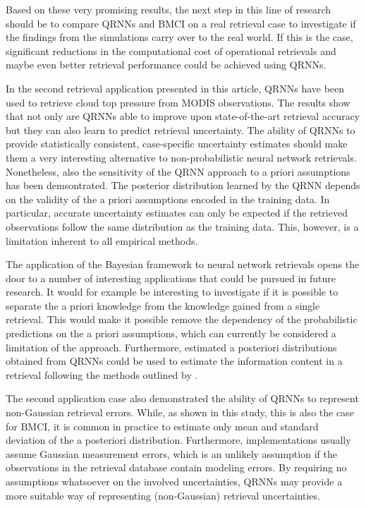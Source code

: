 \documentclass[journal abbreviation, manuscript]{copernicus}
\begin{document}
Based on these very promising results, the next step in this line of research
should be to compare QRNNs and BMCI on a real retrieval case to investigate if
the findings from the simulations carry over to the real world. If this is the
case, significant reductions in the computational cost of operational retrievals
and maybe even better retrieval performance could be achieved using QRNNs.

In the second retrieval application presented in this article, QRNNs have been
used to retrieve cloud top pressure from MODIS observations. The results show
that not only are QRNNs able to improve upon state-of-the-art retrieval accuracy
but they can also learn to predict retrieval uncertainty. The ability of QRNNs
to provide statistically consistent, case-specific uncertainty estimates should
make them a very interesting alternative to non-probabilistic neural network
retrievals. Nonetheless, also the sensitivity of the QRNN approach to a priori
assumptions has been demsontrated. The posterior distribution learned by the
QRNN depends on the validity of the a priori assumptions encoded in the training
data. In particular, accurate uncertainty estimates can only be expected if the
retrieved observations follow the same distribution as the training data. This,
however, is a limitation inherent to all empirical methods.

The application of the Bayesian framework to neural network retrievals opens
the door to a number of interesting applications that could be pursued in future
research. It would for example be interesting to investigate if it is possible
to separate the a priori knowledge from the knowledge gained from a single
retrieval. This would make it possible remove the dependency of the
probabilistic predictions on the a priori assumptions, which can currently be
considered a limitation of the approach. Furthermore, estimated a posteriori
distributions obtained from QRNNs could be used to estimate the information
content in a retrieval following the methods outlined by \citet{rodgers}.

The second application case also demonstrated the ability of QRNNs to represent
non-Gaussian retrieval errors. While, as shown in this study, this is also the case
for BMCI, it is common in practice to estimate only mean and standard
deviation of the a posteriori distribution. Furthermore, implementations usually
assume Gaussian measurement errors, which is an unlikely assumption if the
observations in the retrieval database contain modeling errors. By requiring no
assumptions whatsoever on the involved uncertainties, QRNNs may provide a more
suitable way of representing (non-Gaussian) retrieval uncertainties.
\end{document}
